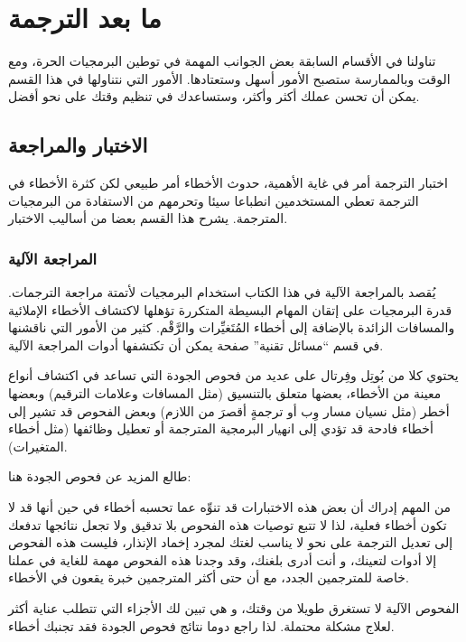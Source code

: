 \chapter{ما بعد الترجمة}
تناولنا في الأقسام السابقة بعض الجوانب المهمة في توطين البرمجيات الحرة،
ومع الوقت وبالممارسة ستصبح الأمور أسهل وستعتادها. الأمور التي نتناولها
في هذا القسم يمكن أن تحسن عملك أكثر وأكثر، وستساعدك في تنظيم وقتك على
نحو أفضل.

\section[ref:34441726]{الاختبار والمراجعة}
اختبار الترجمة أمر في غاية
الأهمية، حدوث الأخطاء أمر طبيعي لكن كثرة الأخطاء في الترجمة تعطي
المستخدمين انطباعا سيئا وتحرمهم من الاستفادة من البرمجيات المترجمة.
يشرح هذا القسم بعضا من أساليب الاختبار.

\subsection[ref:36134309]{المراجعة الآلية}
يُقصد بالمراجعة الآلية في هذا
الكتاب استخدام البرمجيات لأتمتة مراجعة الترجمات. قدرة البرمجيات على
إتقان المهام البسيطة المتكررة تؤهلها لاكتشاف الأخطاء الإملائية
والمسافات الزائدة بالإضافة إلى أخطاء المُتَغيِّرات والرَّقْم. كثير من
الأمور التي ناقشنها في قسم “مسائل تقنية” صفحة
\at[ref:32352020] يمكن أن تكتشفها أدوات المراجعة الآلية.

يحتوي كلا من بُوتِل وفِرتال على عديد من فحوص الجودة التي تساعد في اكتشاف
أنواع معينة من الأخطاء، بعضها متعلق بالتنسيق (مثل المسافات وعلامات
الترقيم) وبعضها أخطر (مثل نسيان مسار وِب أو ترجمةٍ أقصرَ من اللازم)
وبعض الفحوص قد تشير إلى أخطاء فادحة قد تؤدي إلى انهيار البرمجية
المترجمة أو تعطيل وظائفها (مثل أخطاء المتغيرات).

طالع المزيد عن فحوص الجودة هنا:


من المهم إدراك أن بعض هذه الاختبارات قد تنوِّه عما تحسبه أخطاء في حين
أنها قد لا تكون أخطاء فعلية، لذا لا تتبع توصيات هذه الفحوص بلا تدقيق
ولا تجعل نتائجها تدفعك إلى تعديل الترجمة على نحو لا يناسب لغتك لمجرد
إخماد الإنذار، فليست هذه الفحوص إلا أدوات لتعينك، و أنت أدرى بلغنك، وقد
وجدنا هذه الفحوص مهمة للغاية في عملنا خاصة للمترجمين الجدد، مع أن حتى
أكثر المترجمين خبرة يقعون في الأخطاء.

الفحوص الآلية لا تستغرق طويلا من وقتك، و هي تبين لك الأجزاء التي تتطلب
عناية أكثر لعلاج مشكلة محتملة. لذا راجع دوما نتائج فحوص الجودة فقد
تجنبك أخطاء.

